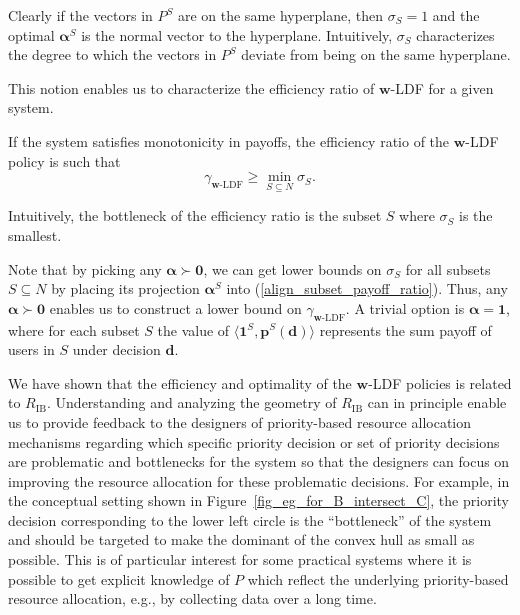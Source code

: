 \documentclass[prodmode,acmtompecs]{acmsmall}
\newcommand{\fullUserSet}{N}
\newcommand{\myComments}[1]{}
\newif\ifinfocom
\newif\ifextended
\newif\ifdissertation
\newcommand{\infocomStart}{\ifinfocom \myComments{Infocom: }}
\newcommand{\extendedStart}{\ifextended  \myComments{Extended version: }}
\newcommand{\dissertationStart}{\ifdissertation  \myComments{Dissertation version: }}
\newcommand{\commentEnd}{\myComments{End}}
\begin{document}
Clearly if the vectors in $P^S$ are on the same hyperplane, then $\sigma_S = 1$ and the optimal $\boldsymbol{\alpha}^S$ is the normal vector to the hyperplane. Intuitively, $\sigma_S$ characterizes the degree to which the vectors in $P^S$ deviate from being on the same hyperplane. 

This notion enables us to characterize the efficiency ratio of $\mathbf{w}$-LDF for a given system. 

\begin{theorem}
\label{thm_efficiency_ratio}
If the system satisfies monotonicity in payoffs, the efficiency ratio of the $\mathbf{w}$-LDF policy is such that
$$
\gamma_{\mathbf{w}\text{-LDF}} \geq \min\limits_{S \subseteq \fullUserSet} \sigma_S. 
$$
\end{theorem}

\infocomStart
See the extended version of this paper \cite{EXT2} for the proof. 
\commentEnd\fi
\extendedStart
\noindent See Appendix \ref{appendix_pf_thm_efficiency_ratio} for the proof. 
\commentEnd\fi
Intuitively, the bottleneck of the efficiency ratio is the subset $S$ where $\sigma_S$ is the smallest. 

Note that by picking any $\boldsymbol{\alpha} \succ \mathbf{0}$, we can get lower bounds on $\sigma_S$ for all subsets $S\subseteq \fullUserSet$ by placing its projection $\boldsymbol{\alpha}^S$ into (\ref{align_subset_payoff_ratio}). Thus, any $\boldsymbol{\alpha}\succ \mathbf{0}$ enables us to construct a lower bound on $\gamma_{\mathbf{w}\text{-LDF}}$. A trivial option is $\boldsymbol{\alpha} = \mathbf{1}$, where for each subset $S$ the value of $\langle \mathbf{1}^S, \mathbf{p}^S(\mathbf{d}) \rangle$ represents the sum payoff of users in $S$ under decision $\mathbf{d}$. 
\dissertationStart
In the sequel we will consider specific resource and user models in SRT context and explore other options of $\boldsymbol{\alpha}^S$ to evaluate $\mathbf{w}$-LDF's efficiency. 
\commentEnd\fi

We have shown that the efficiency and optimality of the $\mathbf{w}$-LDF policies is related to $R_\text{IB}$. 
Understanding and analyzing the geometry of $R_\text{IB}$ can in principle enable us to provide feedback to the designers of priority-based resource allocation mechanisms regarding which specific priority decision or set of priority decisions are problematic and bottlenecks for the system so that the designers can focus on improving the resource allocation for these problematic decisions. 
For example, in the conceptual setting shown in Figure~{\ref{fig_eg_for_B_intersect_C}}, the priority decision corresponding to the lower left circle is the ``bottleneck'' of the system and should be targeted to make the dominant of the convex hull as small as possible. 
This is of particular interest for some practical systems where it is possible to get explicit knowledge of $P$ which reflect the underlying priority-based resource allocation, e.g., by collecting data over a long time. 
\end{document}
